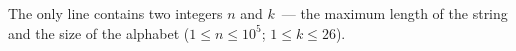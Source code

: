 The only line contains two integers $n$ and $k$~--- the maximum length of the string and the size of the alphabet ($1 \le n \le 10^5$; $1 \le k \le 26$).